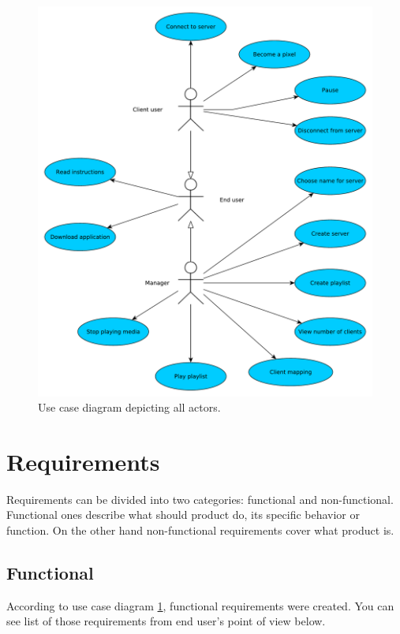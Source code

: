 \begin{figure}[h!]
    \begin{center}
    \includegraphics[scale=0.4]{images/usecase.pdf}
    \caption{Use case diagram depicting all actors.}
    \label{img:usecase}
    \end{center}
\end{figure}

\section{Requirements}
Requirements can be divided into two categories: functional and non-functional. 
Functional ones describe what should product do, its specific behavior or function.
On the other hand non-functional requirements cover what product is.


\subsection{Functional}
According to use case diagram \ref{img:usecase}, functional requirements were created.
You can see list of those requirements from end user's point of view below.


